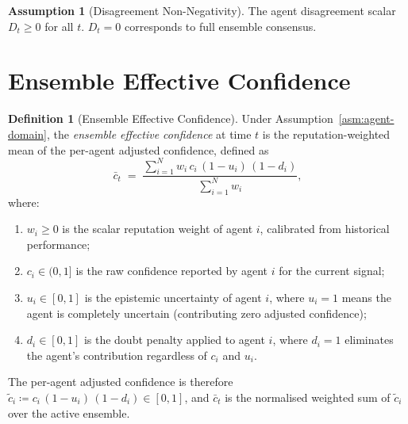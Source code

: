 \documentclass[12pt,openany]{book}
\numberwithin{equation}{chapter}
\theoremstyle{plain}
\theoremstyle{definition}
\newtheorem{definition}[theorem]{Definition}
\newtheorem{assumption}[theorem]{Assumption}
\theoremstyle{remark}
\begin{document}
\begin{assumption}[Disagreement Non-Negativity]
\label{asm:disagreement-nonneg}
The agent disagreement scalar $D_t \geq 0$ for all $t$.
$D_t = 0$ corresponds to full ensemble consensus.
\end{assumption}

\section{Ensemble Effective Confidence}
\label{sec:ensemble-confidence}

\begin{definition}[Ensemble Effective Confidence]
\label{def:effective-confidence}
Under Assumption~\ref{asm:agent-domain}, the
\emph{ensemble effective confidence} at time $t$ is the
reputation-weighted mean of the per-agent adjusted confidence,
defined as
\begin{equation}
  \bar{c}_t \;=\;
  \frac{\displaystyle\sum_{i=1}^{N}
        w_i\,c_i\,(1 - u_i)\,(1 - d_i)}
       {\displaystyle\sum_{i=1}^{N} w_i},
  \label{eq:effective-confidence}
\end{equation}
where:
\begin{enumerate}
  \item $w_i \geq 0$ is the scalar reputation weight of
        agent $i$, calibrated from historical performance;
  \item $c_i \in (0,1]$ is the raw confidence reported by
        agent $i$ for the current signal;
  \item $u_i \in [0,1]$ is the epistemic uncertainty of
        agent $i$, where $u_i = 1$ means the agent is
        completely uncertain (contributing zero adjusted
        confidence);
  \item $d_i \in [0,1]$ is the doubt penalty applied to
        agent $i$, where $d_i = 1$ eliminates the agent's
        contribution regardless of $c_i$ and $u_i$.
\end{enumerate}
The per-agent adjusted confidence is therefore
$\tilde{c}_i \coloneqq c_i\,(1-u_i)\,(1-d_i) \in [0,1]$,
and $\bar{c}_t$ is the normalised weighted sum of
$\tilde{c}_i$ over the active ensemble.
\end{definition}
\end{document}
